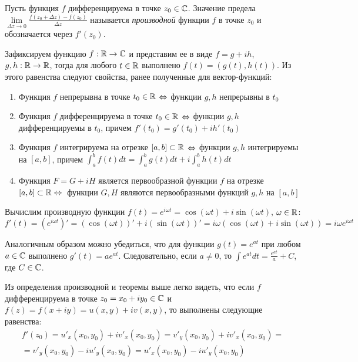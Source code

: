 \begin{definition}
	Пусть функция $f$ дифференцируема в точке $z_0 \in \mathbb{C}$. Значение предела \newline $\lim\limits_{\Delta z \to 0}\frac{f(z_0 + \Delta z) - f(z_0)}{\Delta z}$ называется \textit{производной} функции $f$ в точке $z_0$ и обозначается через $f'(z_0)$.
\end{definition}

\begin{note}
	Зафиксируем функцию $f : \mathbb{R} \to \mathbb{C}$ и представим ее в виде $f = g + ih$, $g, h : \mathbb{R} \to \mathbb{R}$, тогда для любого $t \in \mathbb{R}$ выполнено $f(t) = (g(t), h(t))$. Из этого равенства следуют свойства, ранее полученные для вектор-функций:
	\begin{enumerate}
		\item Функция $f$ непрерывна в точке $t_0 \in \mathbb{R}$ $\Leftrightarrow$ функции $g, h$ непрерывны в $t_0$
		\item Функция $f$ дифференцируема в точке $t_0 \in \mathbb{R}$ $\Leftrightarrow$ функции $g, h$ дифференцируемы в $t_0$, причем $f'(t_0) = g'(t_0) + ih'(t_0)$
		\item Функция $f$ интегрируема на отрезке $[a, b] \subset \mathbb{R}$ $\Leftrightarrow$ функции $g, h$ интегрируемы на $[a, b]$, причем $\int_a^bf(t)dt = \int_a^bg(t)dt + i\int_a^bh(t)dt$
		\item Функция $F = G + iH$ является первообразной функции $f$ на отрезке $[a, b] \subset \R \hm\lra$~функции $G, H$ являются первообразными функций $g, h$ на $[a, b]$
	\end{enumerate}
\end{note}

\begin{unnecessary}
    \begin{example}
    	Вычислим производную функции $f(t) = e^{i\omega t} = \cos(\omega t) + i\sin(\omega t)$, $\omega \in \mathbb{R}$:
    	\[f'(t) = \left(e^{i\omega t}\right)' = \left(\cos(\omega t)\right)' + i \left(\sin(\omega t)\right)' = i\omega(\cos(\omega t) + i\sin(\omega t)) = i\omega e^{i \omega t}\]
    	
    	Аналогичным образом можно убедиться, что для функции $g(t) = e^{at}$ при любом $a \in \mathbb{C}$ выполнено $g'(t) = ae^{at}$. Следовательно, если $a \ne 0$, то $\int e^{at}dt = \frac{e^{at}}{a} + C$, где $C \in \mathbb{C}$.
    \end{example}


    \begin{note}
    	Из определения производной и теоремы выше легко видеть, что если $f$ дифференцируема в точке $z_0 = x_0 + iy_0 \in \mathbb{C}$ и $f(z) = f(x + iy) = u(x, y) + iv(x, y)$, то выполнены следующие равенства:
    	\begin{multline*}
    		f'(z_0) = u'_x(x_0, y_0) + iv'_x(x_0, y_0) = v'_y(x_0, y_0) + iv'_x(x_0, y_0) =
    		\\
    		= v'_y(x_0, y_0) - iu'_y(x_0, y_0) = u'_x(x_0, y_0) - iu'_y(x_0, y_0)
    	\end{multline*}
    \end{note}
\end{unnecessary}

